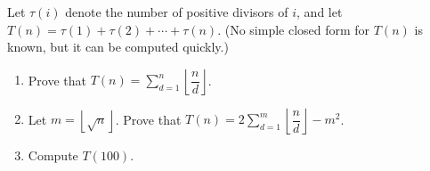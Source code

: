 Let $\tau(i)$ denote the number of positive divisors of $i$, and let $T(n)=\tau(1)+\tau(2)+\cdots+\tau(n)$. (No simple closed form for $T(n)$ is known, but it can be computed quickly.)
\begin{enumerate}
\item[(a)] Prove that $T(n)=\displaystyle\sum_{d=1}^{n}\left\lfloor\dfrac nd\right\rfloor$.
\item[(b)] Let $m=\left\lfloor\sqrt n\right\rfloor$. Prove that $T(n)=2\displaystyle\sum_{d=1}^{m}\left\lfloor\dfrac nd\right\rfloor-m^2$.
\item[(c)] Compute $T(100)$.
\end{enumerate}

